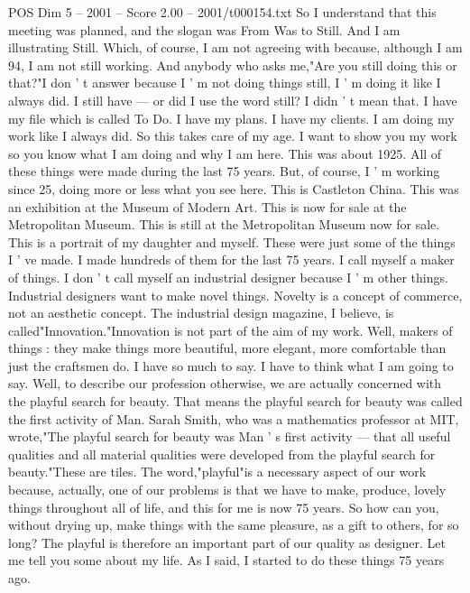 \begin{textsample}{POS Dim 5 – 2001 – Score 2.00 – 2001/t000154.txt}  \label{ex:f5_pos_049}
So I understand that this meeting was planned, and the slogan was From Was to Still.
And I am illustrating Still.
Which, of course, I am not agreeing with because, although I am 94, I am not still working.
And anybody who asks me,"Are you still doing this or that?"I don ' t answer because I ' m not doing things still, I ' m doing it like I always did.
I still have — or did I use the word still?
I didn ' t mean that.
I have my file which is called To Do.
I have my plans.
I have my clients.
I am doing my work like I always did.
So this takes care of my age.
I want to show you my work so you know what I am doing and why I am here.
This was about 1925.
All of these things were made during the last 75 years.
But, of course, I ' m working since 25, doing more or less what you see here.
This is Castleton China.
This was an exhibition at the Museum of Modern Art.
This is now for sale at the Metropolitan Museum.
This is still at the Metropolitan Museum now for sale.
This is a portrait of my daughter and myself.
These were just some of the things I ' ve made.
I made hundreds of them for the last 75 years.
I call myself a maker of things.
I don ' t call myself an industrial designer because I ' m other things.
Industrial designers want to make novel things.
Novelty is a concept of commerce, not an aesthetic concept.
The industrial design magazine, I believe, is called"Innovation."Innovation is not part of the aim of my work.
Well, makers of things : they make things more beautiful, more elegant, more comfortable than just the craftsmen do.
I have so much to say.
I have to think what I am going to say.
Well, to describe our profession otherwise, we are actually concerned with the playful search for beauty.
That means the playful search for beauty was called the first activity of Man.
Sarah Smith, who was a mathematics professor at MIT, wrote,"The playful search for beauty was Man ' s first activity — that all useful qualities and all material qualities were developed from the playful search for beauty."These are tiles.
The word,"playful"is a necessary aspect of our work because, actually, one of our problems is that we have to make, produce, lovely things throughout all of life, and this for me is now 75 years.
So how can you, without drying up, make things with the same pleasure, as a gift to others, for so long?
The playful is therefore an important part of our quality as designer.
Let me tell you some about my life.
As I said, I started to do these things 75 years ago.

\end{textsample}
